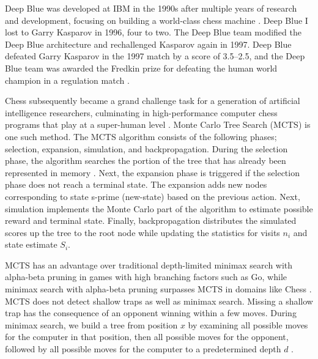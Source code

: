 \documentclass[12pt]{turabian-researchpaper}
\begin{document}
Deep Blue was developed at IBM in the 1990s after multiple years of research and development, focusing on building a world-class chess machine \parencite{campbell_deep_2002}. Deep Blue I lost to Garry Kasparov in 1996, four to two. The Deep Blue team modified the Deep Blue architecture and rechallenged Kasparov again in 1997. Deep Blue defeated Garry Kasparov in the 1997 match by a score of 3.5–2.5, and the  Deep Blue team was awarded the Fredkin prize for defeating the human world champion in a regulation match \parencite{campbell_deep_2002}.

Chess subsequently became a grand challenge task for a generation of artificial intelligence researchers, culminating in high-performance computer chess programs that play at a super-human level \parencite{silver_general_2018}. Monte Carlo Tree Search (MCTS) is one such method. The MCTS algorithm consists of the following phases; selection, expansion, simulation, and backpropagation.  During the selection phase, the algorithm searches the portion of the tree that has already been represented in memory \parencite{swiechowski2021}. Next, the expansion phase is triggered if the selection phase does not reach a terminal state. The expansion adds new nodes corresponding to state s-prime (new-state) based on the previous action. Next, simulation implements the Monte Carlo part of the algorithm to estimate possible reward and terminal state. Finally, backpropagation distributes the simulated scores up the tree to the root node while updating the statistics for visits \(n_i\) and state estimate \(S_i\). 

MCTS has an advantage over traditional depth-limited minimax search with alpha-beta pruning in games with high branching factors such as Go, while minimax search with alpha-beta pruning surpasses MCTS in domains like Chess \parencite{lin_monte_2017}. MCTS does not detect shallow traps as well as minimax search. Missing a shallow trap has the consequence of an opponent winning within a few moves. During minimax search, we build a tree from position \(x\) by examining all possible moves for the computer in that position, then all possible moves for the opponent, followed by all possible moves for the computer to a predetermined depth \(d\) \parencite{baxter_learning_2000}. 
\end{document}
